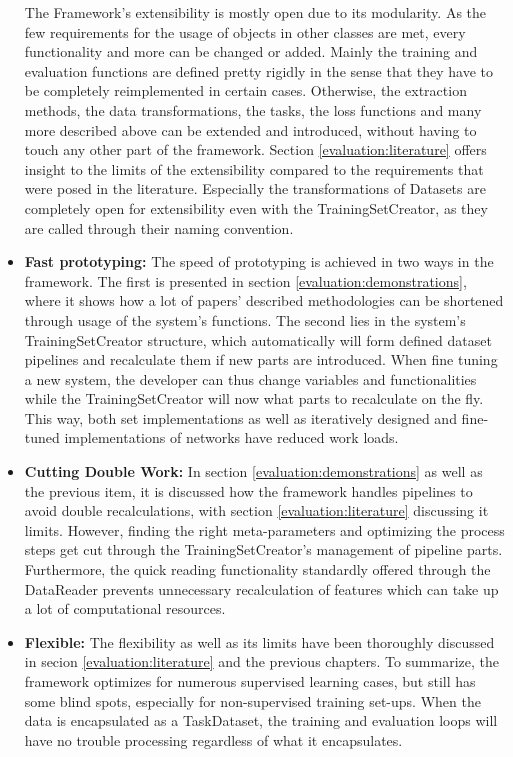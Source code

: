 \begin{itemize}
	The Framework's extensibility is mostly open due to its modularity. As the few requirements for the usage of objects in other classes are met, every functionality and more can be changed or added. Mainly the training and evaluation functions are defined pretty rigidly in the sense that they have to be completely reimplemented in certain cases. Otherwise, the extraction methods, the data transformations, the tasks, the loss functions and many more described above can be extended and introduced, without having to touch any other part of the framework. Section \ref{evaluation:literature} offers insight to the limits of the extensibility compared to the requirements that were posed in the literature. Especially the transformations of Datasets are completely open for extensibility even with the TrainingSetCreator, as they are called through their naming convention.\\
	
	\item \textbf{Fast prototyping:} 
	The speed of prototyping is achieved in two ways in the framework. The first is presented in section \ref{evaluation:demonstrations}, where it shows how a lot of papers' described methodologies can be shortened through usage of the system's functions. The second lies in the system's TrainingSetCreator structure, which automatically will form defined dataset pipelines and recalculate them if new parts are introduced. When fine tuning a new system, the developer can thus change variables and functionalities while the TrainingSetCreator will now what parts to recalculate on the fly. This way, both set implementations as well as iteratively designed and fine-tuned implementations of networks have reduced work loads. 
	\item \textbf{Cutting Double Work:} 
	In section \ref{evaluation:demonstrations} as well as the previous item, it is discussed how the framework handles pipelines to avoid double recalculations, with section \ref{evaluation:literature} discussing it limits. However, finding the right meta-parameters and optimizing the process steps get cut through the TrainingSetCreator's management of pipeline parts. Furthermore, the quick reading functionality standardly offered through the DataReader prevents unnecessary recalculation of features which can take up a lot of computational resources.  
	\item \textbf{Flexible:} 
	The flexibility as well as its limits have been thoroughly discussed in secion \ref{evaluation:literature} and the previous chapters. To summarize, the framework optimizes for numerous supervised learning cases, but still has some blind spots, especially for non-supervised training set-ups. When the data is encapsulated as a TaskDataset, the training and evaluation loops will have no trouble processing regardless of what it encapsulates.
\end{itemize}

